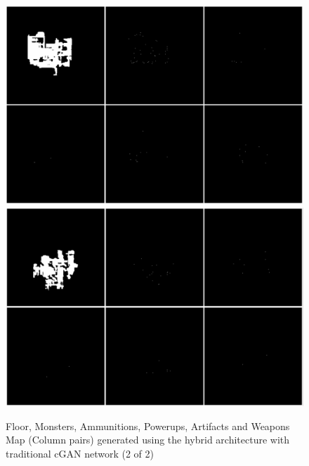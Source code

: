 \documentclass{Configuration_Files/PoliMi3i_thesis}
\begin{document}
\begin{figure}[H]
    \centering
    \includegraphics[width=1\textwidth]{trad_cgan_sample3.jpg}
    \includegraphics[width=1\textwidth]{trad_cgan_sample4.jpg}
    \caption[Samples generated using the traditional cGAN network (2 of 2)]{Floor, Monsters, Ammunitions, Powerups, Artifacts and Weapons Map 
(Column pairs) generated using the hybrid architecture with traditional cGAN network (2 of 2)}
    \label{fig:tradcgansample2}
\end{figure}
\end{document}
